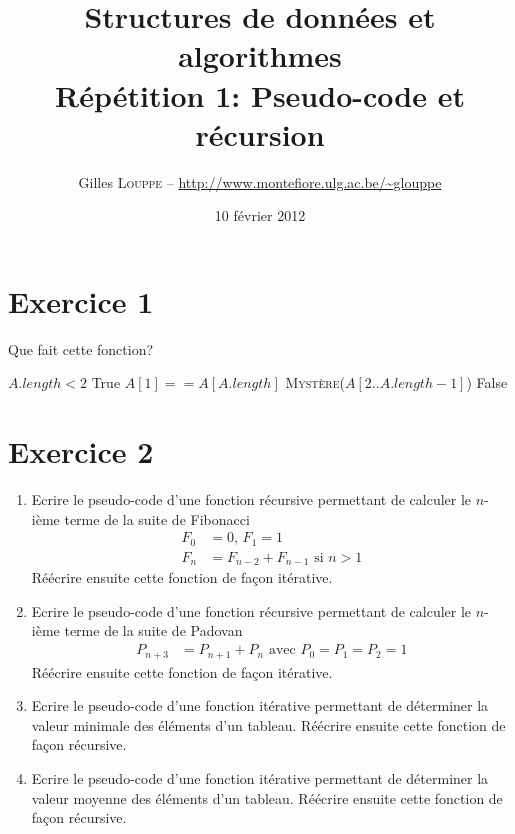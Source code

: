 \documentclass[a4paper,10pt]{article}
\title{
    \textbf{Structures de données et algorithmes}\\
    Répétition 1: Pseudo-code et récursion
}
\author{Gilles \textsc{Louppe} -- \url{http://www.montefiore.ulg.ac.be/~glouppe}}
\date{10 février 2012}
\begin{document}
\maketitle

\section*{Exercice 1}

Que fait cette fonction?

\begin{codebox}
    \li \If $A.length < 2$
    \li \Then   \Return True
    \li \Else
    \li       \If $A[1] == A[A.length]$
    \li       \Then \Return \textsc{Mystère}($A[2..A.length-1]$)
    \li       \Else
    \li             \Return False
              \End
        \End
    \End
\end{codebox}

\section*{Exercice 2}

\begin{enumerate}
\item Ecrire le pseudo-code d'une fonction récursive permettant de calculer le $n$-ième terme de la suite de Fibonacci
\begin{align*}
F_0 &= 0\text{, } F_1 = 1 \\
F_n &= F_{n-2} + F_{n-1} \text{ si } n > 1
\end{align*}
Réécrire ensuite cette fonction de façon itérative.

\item Ecrire le pseudo-code d'une fonction récursive permettant de calculer le $n$-ième terme de la suite de Padovan
\begin{align*}
P_{n+3} &= P_{n+1} + P_n \text{ avec } P_0 = P_1 = P_2 = 1
\end{align*}
Réécrire ensuite cette fonction de façon itérative.

\item Ecrire le pseudo-code d'une fonction itérative permettant de déterminer la valeur minimale des éléments d'un tableau. Réécrire ensuite cette fonction de façon récursive.

\item Ecrire le pseudo-code d'une fonction itérative permettant de déterminer la valeur moyenne des éléments d'un tableau. Réécrire ensuite cette fonction de façon récursive.

\end{enumerate}
\end{document}
